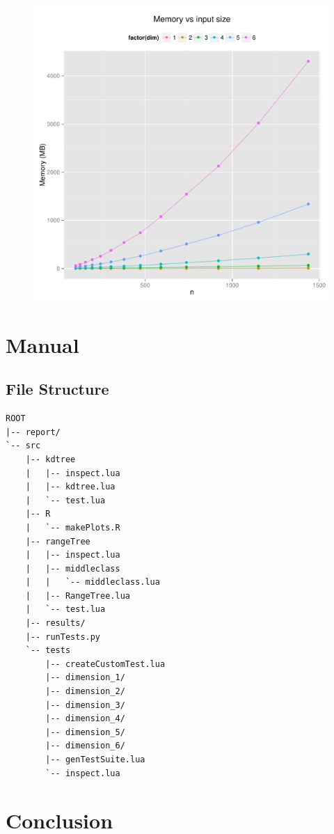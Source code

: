 \documentclass{article}
\begin{document}
\begin{figure}[H]
    \centering
    \includegraphics[width=\textwidth]{../src/R/plots/rtmem.pdf}
\end{figure}
\section{Manual}
\subsection{File Structure}
\begin{verbatim}
ROOT
|-- report/
`-- src
    |-- kdtree
    |   |-- inspect.lua
    |   |-- kdtree.lua
    |   `-- test.lua
    |-- R
    |   `-- makePlots.R
    |-- rangeTree
    |   |-- inspect.lua
    |   |-- middleclass
    |   |   `-- middleclass.lua
    |   |-- RangeTree.lua
    |   `-- test.lua
    |-- results/
    |-- runTests.py
    `-- tests
        |-- createCustomTest.lua
        |-- dimension_1/
        |-- dimension_2/
        |-- dimension_3/
        |-- dimension_4/
        |-- dimension_5/
        |-- dimension_6/
        |-- genTestSuite.lua
        `-- inspect.lua
\end{verbatim}

\section{Conclusion}
\end{document}
